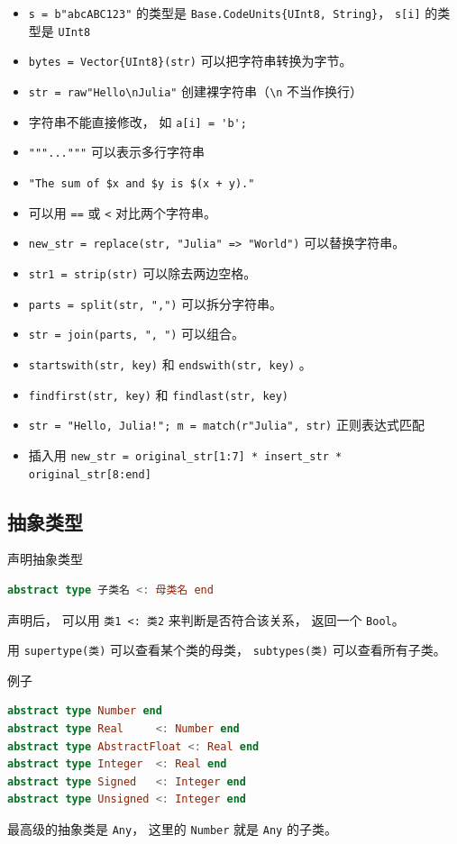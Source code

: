 \begin{itemize}
\item \verb`s = b"abcABC123"` 的类型是 \verb`Base.CodeUnits{UInt8, String}`， \verb`s[i]` 的类型是 \verb`UInt8`
\item \verb`bytes = Vector{UInt8}(str)` 可以把字符串转换为字节。
\item \verb`str = raw"Hello\nJulia"` 创建裸字符串（\verb`\n` 不当作换行）
\item 字符串不能直接修改， 如 \verb`a[i] = 'b';`
\item \verb`"""..."""` 可以表示多行字符串
\item \verb`"The sum of $x and $y is $(x + y)."`
\item 可以用 \verb`==` 或 \verb`<` 对比两个字符串。
\item \verb`new_str = replace(str, "Julia" => "World")` 可以替换字符串。
\item \verb`str1 = strip(str)` 可以除去两边空格。
\item \verb`parts = split(str, ",")` 可以拆分字符串。
\item \verb`str = join(parts, ", ")` 可以组合。
\item \verb`startswith(str, key)` 和 \verb`endswith(str, key)` 。
\item \verb`findfirst(str, key)` 和 \verb`findlast(str, key)`
\item \verb`str = "Hello, Julia!"; m = match(r"Julia", str)` 正则表达式匹配
\item 插入用 \verb`new_str = original_str[1:7] * insert_str * original_str[8:end]`
\end{itemize}


\subsection{抽象类型}
声明抽象类型
\begin{lstlisting}[language=julia]
abstract type 子类名 <: 母类名 end
\end{lstlisting}
声明后， 可以用 \verb`类1 <: 类2` 来判断是否符合该关系， 返回一个 \verb`Bool`。

用 \verb`supertype(类)` 可以查看某个类的母类， \verb`subtypes(类)` 可以查看所有子类。

例子
\begin{lstlisting}[language=julia]
abstract type Number end
abstract type Real     <: Number end
abstract type AbstractFloat <: Real end
abstract type Integer  <: Real end
abstract type Signed   <: Integer end
abstract type Unsigned <: Integer end
\end{lstlisting}
最高级的抽象类是 \verb`Any`， 这里的 \verb`Number` 就是 \verb`Any` 的子类。

